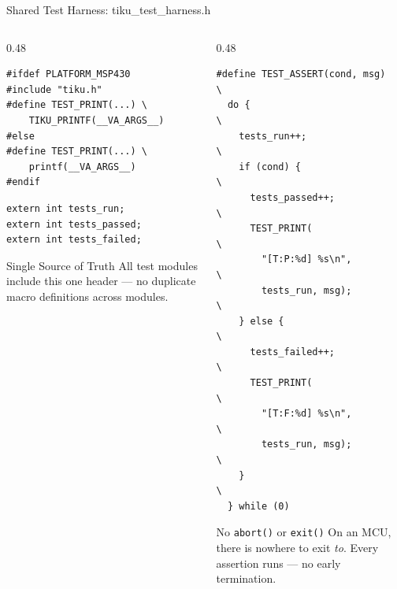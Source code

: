 \documentclass[aspectratio=169, 10pt]{beamer}
\begin{document}
\begin{frame}[fragile]{Shared Test Harness: tiku\_test\_harness.h}
\begin{columns}[T]
\begin{column}{0.48\textwidth}
\begin{lstlisting}[style=cstyle, title={Platform-aware print}]
#ifdef PLATFORM_MSP430
#include "tiku.h"
#define TEST_PRINT(...) \
    TIKU_PRINTF(__VA_ARGS__)
#else
#define TEST_PRINT(...) \
    printf(__VA_ARGS__)
#endif
\end{lstlisting}

\begin{lstlisting}[style=cstyle, title={Global counters}]
extern int tests_run;
extern int tests_passed;
extern int tests_failed;
\end{lstlisting}

\vspace{0.3em}
\begin{block}{Single Source of Truth}
All test modules include this one header ---
no duplicate macro definitions across modules.
\end{block}
\end{column}

\begin{column}{0.48\textwidth}
\begin{lstlisting}[style=cstyle, title={Assertion macro}]
#define TEST_ASSERT(cond, msg)      \
  do {                              \
    tests_run++;                    \
    if (cond) {                     \
      tests_passed++;               \
      TEST_PRINT(                   \
        "[T:P:%d] %s\n",           \
        tests_run, msg);            \
    } else {                        \
      tests_failed++;               \
      TEST_PRINT(                   \
        "[T:F:%d] %s\n",           \
        tests_run, msg);            \
    }                               \
  } while (0)
\end{lstlisting}

\vspace{0.3em}
\begin{alertblock}{No \texttt{abort()} or \texttt{exit()}}
On an MCU, there is nowhere to exit \emph{to}.
Every assertion runs --- no early termination.
\end{alertblock}
\end{column}
\end{columns}
\end{frame}
\end{document}
